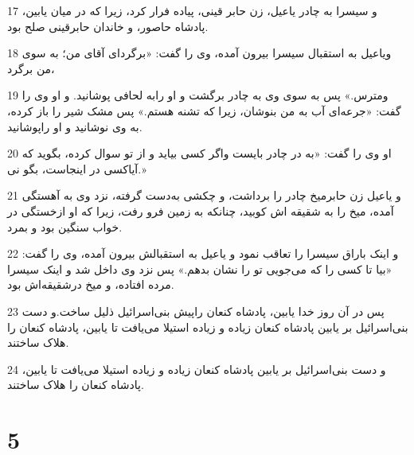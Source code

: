\par 17 و سیسرا به چادر یاعیل، زن حابر قینی، پیاده فرار کرد، زیرا که در میان یابین، پادشاه حاصور، و خاندان حابرقینی صلح بود.
\par 18 ویاعیل به استقبال سیسرا بیرون آمده، وی را گفت: «برگرد‌ای آقای من؛ به سوی من برگرد،
\par 19 ومترس.» پس به سوی وی به چادر برگشت و او رابه لحافی پوشانید. و او وی را گفت: «جرعه‌ای آب به من بنوشان، زیرا که تشنه هستم.» پس مشک شیر را باز کرده، به وی نوشانید و او راپوشانید.
\par 20 او وی را گفت: «به در چادر بایست واگر کسی بیاید و از تو سوال کرده، بگوید که آیاکسی در اینجاست، بگو نی.»
\par 21 و یاعیل زن حابرمیخ چادر را برداشت، و چکشی به‌دست گرفته، نزد وی به آهستگی آمده، میخ را به شقیقه اش کوبید، چنانکه به زمین فرو رفت، زیرا که او ازخستگی در خواب سنگین بود و بمرد.
\par 22 و اینک باراق سیسرا را تعاقب نمود و یاعیل به استقبالش بیرون آمده، وی را گفت: «بیا تا کسی را که می‌جویی تو را نشان بدهم.» پس نزد وی داخل شد و اینک سیسرا مرده افتاده، و میخ درشقیقه‌اش بود.
\par 23 پس در آن روز خدا یابین، پادشاه کنعان راپیش بنی‌اسرائیل ذلیل ساخت.و دست بنی‌اسرائیل بر یابین پادشاه کنعان زیاده و زیاده استیلا می‌یافت تا یابین، پادشاه کنعان را هلاک ساختند.
\par 24 و دست بنی‌اسرائیل بر یابین پادشاه کنعان زیاده و زیاده استیلا می‌یافت تا یابین، پادشاه کنعان را هلاک ساختند.
 
\chapter{5}

